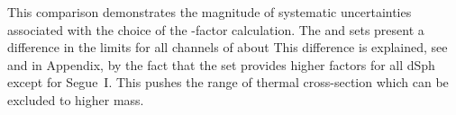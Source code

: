 This comparison demonstrates the magnitude of systematic uncertainties associated with the choice of the \J-factor calculation.
The \GS and \B sets present a difference in the limits for all channels of about
This difference is explained, see   and  in Appendix, by the fact that the \B set provides higher \J factors for all dSph except for Segue~I. This pushes the range of thermal cross-section which can be excluded to higher mass.

\begin{figure}[h!]
\end{figure}
